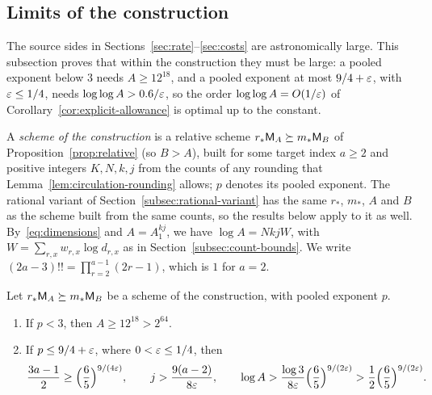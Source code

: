 \subsection{Limits of the construction}
\label{subsec:limits}

The source sides in Sections~\ref{sec:rate}--\ref{sec:costs} are
astronomically large. This subsection proves that within the
construction they must be large: a pooled exponent below \(3\) needs
\(A\ge12^{18}\), and a pooled exponent at most \(9/4+\varepsilon\), with
\(\varepsilon\le1/4\), needs \(\log\log A>0.6/\varepsilon\), so the order \(\log\log A=O(1/\varepsilon)\) of
Corollary~\ref{cor:explicit-allowance} is optimal up to the constant.

A \emph{scheme of the construction} is a relative scheme
\(r_*\mathsf M_A\succeq m_*\mathsf M_B\) of Proposition~\ref{prop:relative} (so
\(B>A\)), built for some target index \(a\ge2\) and positive integers
\(K,N,k,j\) from the counts of any rounding that
Lemma~\ref{lem:circulation-rounding} allows; \(p\) denotes its pooled
exponent. The rational variant of Section~\ref{subsec:rational-variant}
has the same \(r_*\), \(m_*\), \(A\) and \(B\) as the scheme built from
the same counts, so the results below apply to it as well.
By~\eqref{eq:dimensions} and \(A=A_1^{kj}\), we have \(\log A=NkjW\),
with \(W=\sum_{r,x}w_{r,x}\log d_{r,x}\) as in
Section~\ref{subsec:count-bounds}. We write
\((2a-3)!!=\prod_{r=2}^{a-1}(2r-1)\), which is \(1\) for \(a=2\).

\begin{proposition}
\label{prop:source-lower}
Let \(r_*\mathsf M_A\succeq m_*\mathsf M_B\) be a scheme of the construction, with
pooled exponent \(p\).
\begin{enumerate}
\item[(a)] If \(p<3\), then \(A\ge12^{18}>2^{64}\).
\item[(b)] If \(p\le9/4+\varepsilon\), where \(0<\varepsilon\le1/4\), then
\[
 \frac{3a-1}2\ge\Bigl(\frac65\Bigr)^{9/(4\varepsilon)},\qquad
 j>\frac{9(a-2)}{8\varepsilon},\qquad
 \log A>\frac{\log3}{8\varepsilon}\Bigl(\frac65\Bigr)^{9/(2\varepsilon)}
 >\frac12\Bigl(\frac65\Bigr)^{9/(2\varepsilon)}.
\]
\end{enumerate}
\end{proposition}

